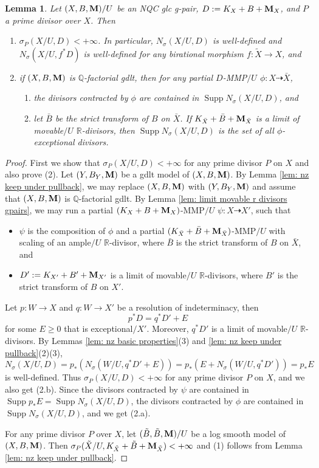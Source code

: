 \documentclass[11pt]{amsart}
\numberwithin{equation}{section}
\newcommand{\Mm}{{\bf{M}}}
\newcommand{\Qq}{\mathbb{Q}}
\newcommand{\Rr}{\mathbb{R}}
\newcommand{\Supp}{\operatorname{Supp}}
\newtheorem{lem}[thm]{Lemma}
\theoremstyle{definition}
\theoremstyle{definition}
\theoremstyle{definition}
\begin{document}
\begin{lem}\label{lem: nz for glc divisor}
Let $(X,B,\Mm)/U$ be an NQC glc g-pair, $D:=K_X+B+\Mm_X$, and $P$ a prime divisor over $X$. Then
\begin{enumerate}
    \item $\sigma_P(X/U,D)<+\infty$. In particular, $N_{\sigma}(X/U,D)$ is well-defined and $N_{\sigma}(X/U,f^*D)$ is well-defined for any birational morphism $f: \tilde X\rightarrow X$, and
    \item if $(X,B,\Mm)$ is $\Qq$-factorial gdlt, then for any partial $D$-MMP$/U$ $\phi: X\dashrightarrow \bar X$, 
    \begin{enumerate}
    \item the divisors contracted by $\phi$ are contained in $\Supp N_{\sigma}(X/U,D)$, and
    \item let $\bar B$ be the strict transform of $B$ on $\bar X$. If $K_{\bar X}+\bar B+\Mm_{\bar X}$ is a limit of movable$/U$ $\Rr$-divisors, then $\Supp N_{\sigma}(X/U,D)$ is the set of all $\phi$-exceptional divisors.
    \end{enumerate}
\end{enumerate} 
\end{lem}
\begin{proof}
First we show that $\sigma_P(X/U,D)<+\infty$ for any prime divisor $P$ on $X$ and also prove (2). Let $(Y,B_Y,\Mm)$ be a gdlt model of $(X,B,\Mm)$. By Lemma \ref{lem: nz keep under pullback}, we may replace $(X,B,\Mm)$ with  $(Y,B_Y,\Mm)$  and assume that $(X,B,\Mm)$ is $\Qq$-factorial gdlt. By Lemma \ref{lem: limit movable r divisors gpairs}, we may run a partial $(K_X+B+\Mm_X)$-MMP$/U$ $\psi: X\dashrightarrow X'$, such that
\begin{itemize}
    \item $\psi$ is the composition of $\phi$ and a partial $(K_{\bar X}+\bar B+\Mm_{\bar X})$-MMP$/U$ with scaling of an ample$/U$ $\Rr$-divisor, where $\bar B$ is the strict transform of $B$ on $\bar X$, and
    \item $D':=K_{X'}+B'+\Mm_{X'}$ is a limit of movable$/U$ $\Rr$-divisors, where $B'$ is the strict transform of $B$ on $X'$.
\end{itemize} 
Let $p: W\rightarrow X$ and $q: W\rightarrow X'$ be a resolution of indeterminacy, then
$$p^*D=q^*D'+E$$
for some $E\geq 0$ that is exceptional$/X'$. Moreover, $q^*D'$ is a limit of movable$/U$ $\Rr$-divisors. By Lemmas \ref{lem: nz basic properties}(3) and \ref{lem: nz keep under pullback}(2)(3), 
$$N_{\sigma}(X/U,D)=p_*(N_{\sigma}(W/U,q^*D'+E))=p_*(E+N_{\sigma}(W/U,q^*D'))=p_*E$$
is well-defined. Thus $\sigma_P(X/U,D)<+\infty$ for any prime divisor $P$ on $X$, and we also get (2.b). Since the divisors contracted by $\psi$ are contained in $\Supp p_*E=\Supp N_{\sigma}(X/U,D)$, the divisors contracted by $\phi$ are contained in $\Supp N_{\sigma}(X/U,D)$, and we get (2.a).

For any prime divisor $P$ over $X$, let $(\tilde B,\tilde B,\Mm)/U$ be a log smooth model of $(X,B,\Mm)$. Then $\sigma_P(\tilde X/U, K_{\tilde X}+\tilde B+\Mm_{\tilde X})<+\infty$ and (1) follows from Lemma \ref{lem: nz keep under pullback}.
\end{proof}
\end{document}
